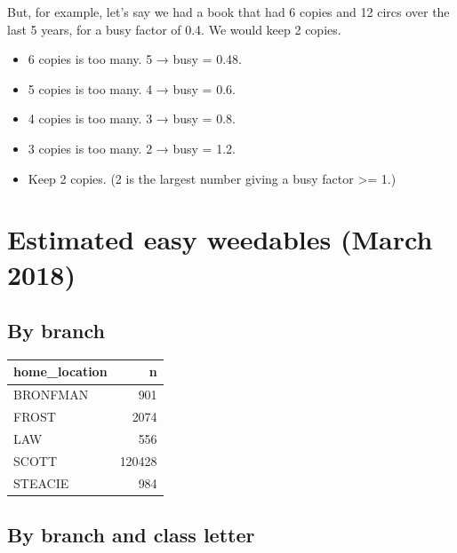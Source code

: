 \documentclass[11pt]{article}
\begin{document}
But, for example, let's say we had a book that had 6 copies and 12 circs over the last 5 years, for a busy factor of 0.4.  We would keep 2 copies.

\begin{itemize}
\item 6 copies is too many.  5 → busy = 0.48.
\item 5 copies is too many.  4 → busy = 0.6.
\item 4 copies is too many.  3 → busy = 0.8.
\item 3 copies is too many.  2 → busy = 1.2.
\item Keep 2 copies.  (2 is the largest number giving a busy factor >= 1.)
\end{itemize}

\section*{Estimated easy weedables (March 2018)}
\label{sec:orgc4edbf7}

\subsection*{By branch}
\label{sec:org25d1884}

\begin{center}
\begin{tabular}{lr}
home\_location & n\\
\hline
BRONFMAN & 901\\
FROST & 2074\\
LAW & 556\\
SCOTT & 120428\\
STEACIE & 984\\
\end{tabular}
\end{center}

\subsection*{By branch and class letter}
\label{sec:orgda63663}
\end{document}
